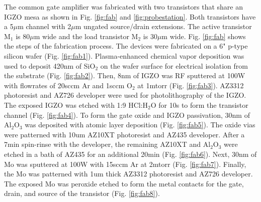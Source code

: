 \documentclass[conference]{IEEEtran}
\begin{document}
The common gate amplifier was fabricated with two transistors that share an IGZO mesa as shown in Fig. \ref{fig:fab} and \ref{fig:probestation}.
Both transistors have a 5$\mu$m channel with 2$\mu$m ungated source/drain extensions.
The active transistor M$_1$ is 80$\mu$m wide and the load transistor M$_2$ is 30$\mu$m wide.
Fig. \ref{fig:fab} shows the steps of the fabrication process.
The devices were fabricated on a 6" p-type silicon wafer (Fig. \ref{fig:fab1}).
Plasma-enhanced chemical vapor deposition was used to deposit 420nm of SiO$_2$ on the wafer surface for electrical isolation from the substrate (Fig. \ref{fig:fab2}).
Then, 8nm of IGZO was RF sputtered at 100W with flowrates of 20sccm Ar and 1sccm O$_2$ at 1mtorr (Fig. \ref{fig:fab3}).
AZ3312 photoresist and AZ726 developer were used for photolithography of the IGZO.
The exposed IGZO was etched with 1:9 HCl:H$_2$O for 10s to form the transistor channel (Fig. \ref{fig:fab4}).
To form the gate oxide and IGZO passivation, 30nm of Al$_2$O$_3$ was deposited with atomic layer deposition (Fig. \ref{fig:fab5}).
The oxide vias were patterned with 10um AZ10XT photoresist and AZ435 developer.
After a 7min spin-rinse with the developer, the remaining AZ10XT and Al$_2$O$_3$ were etched in a bath of AZ435 for an additional 20min (Fig. \ref{fig:fab6}).
Next, 30nm of Mo was sputtered at 100W with 15sccm Ar at 2mtorr (Fig. \ref{fig:fab7}).
Finally, the Mo was patterned with 1um thick AZ3312 photoresist and AZ726 developer.
The exposed Mo was peroxide etched to form the metal contacts for the gate, drain, and source of the transistor (Fig. \ref{fig:fab8}).
\end{document}

